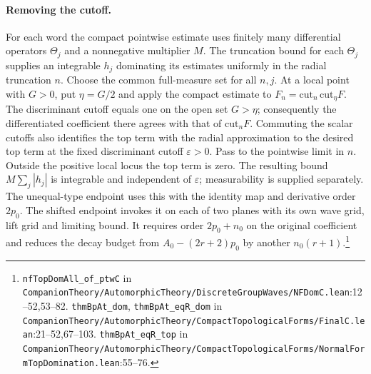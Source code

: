 \paragraph{Removing the cutoff.}
For each word the compact pointwise estimate uses finitely many differential operators $\Theta_j$ and a nonnegative multiplier $M$. The truncation bound for each $\Theta_j$ supplies an integrable $h_j$ dominating its estimates uniformly in the radial truncation $n$. Choose the common full-measure set for all $n,j$. At a local point with $G>0$, put $\eta=G/2$ and apply the compact estimate to $F_n=\mathrm{cut}_n\,\mathrm{cut}_{\eta}F$. The discriminant cutoff equals one on the open set $G>\eta$; consequently the differentiated coefficient there agrees with that of $\mathrm{cut}_n F$. Commuting the scalar cutoffs also identifies the top term with the radial approximation to the desired top term at the fixed discriminant cutoff $\varepsilon>0$. Pass to the pointwise limit in $n$. Outside the positive local locus the top term is zero. The resulting bound $M\sum_j |h_j|$ is integrable and independent of $\varepsilon$; measurability is supplied separately. The unequal-type endpoint uses this with the identity map and derivative order $2p_0$. The shifted endpoint invokes it on each of two planes with its own wave grid, lift grid and limiting bound. It requires order $2p_0+n_0$ on the original coefficient and reduces the decay budget from $A_0-(2r+2)p_0$ by another $n_0(r+1)$.\footnote{\nolinkurl{nfTopDomAll_of_ptwC} in \nolinkurl{CompanionTheory/AutomorphicTheory/DiscreteGroupWaves/NFDomC.lean}\allowbreak:12--52,53--82. \nolinkurl{thmBpAt_dom}, \nolinkurl{thmBpAt_eqR_dom} in \nolinkurl{CompanionTheory/AutomorphicTheory/CompactTopologicalForms/FinalC.lean}\allowbreak:21--52,67--103. \nolinkurl{thmBpAt_eqR_top} in \nolinkurl{CompanionTheory/AutomorphicTheory/CompactTopologicalForms/NormalFormTopDomination.lean}\allowbreak:55--76.}

